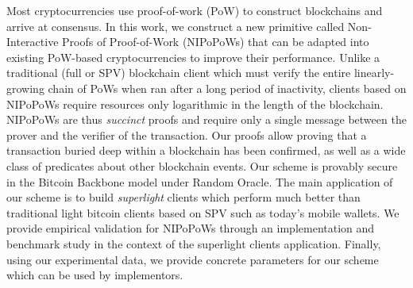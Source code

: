 Most cryptocurrencies use proof-of-work (PoW) to construct blockchains and arrive at consensus. In this work, we construct a new primitive called Non-Interactive Proofs of Proof-of-Work (NIPoPoWs) that can be adapted into existing PoW-based cryptocurrencies to improve their performance. Unlike a traditional (full or SPV) blockchain client which must verify the entire linearly-growing chain of PoWs when ran after a long period of inactivity, clients based on NIPoPoWs require resources only logarithmic in the length of the blockchain. NIPoPoWs are thus \emph{succinct} proofs and require only a single message between the prover and the verifier of the transaction. Our proofs allow proving that a transaction buried deep within a blockchain has been confirmed, as well as a wide class of predicates about other blockchain events. Our scheme is provably secure in the Bitcoin Backbone model under Random Oracle.
The main application of our scheme is to build \emph{superlight} clients which perform much better than traditional light bitcoin clients based on SPV such as today's mobile wallets. We provide empirical validation for NIPoPoWs through an implementation and benchmark study in the context of the superlight clients application. Finally, using our experimental data, we provide concrete parameters for our scheme which can be used by implementors.
